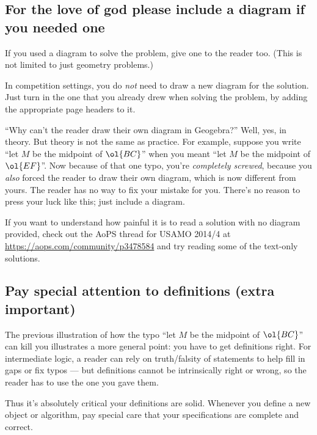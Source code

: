 \documentclass[11pt]{scrartcl}
\begin{document}
\subsection{For the love of god please include a diagram if you needed one}
If you used a diagram to solve the problem, give one to the reader too.
(This is not limited to just geometry problems.)

In competition settings, you do \emph{not} need to draw a new diagram for the solution.
Just turn in the one that you already drew when solving the problem,
by adding the appropriate page headers to it.

``Why can't the reader draw their own diagram in Geogebra?''
Well, yes, in theory. But theory is not the same as practice.
For example, suppose you write ``let $M$ be the midpoint of $\ol{BC}$''
when you meant ``let $M$ be the midpoint of $\ol{EF}$''.
Now because of that one typo, you're \emph{completely screwed},
because you \emph{also} forced the reader to draw their own diagram,
which is now different from yours.
The reader has no way to fix your mistake for you.
There's no reason to press your luck like this; just include a diagram.

If you want to understand how painful it is to read a solution with no diagram provided,
check out the AoPS thread for USAMO 2014/4 at \url{https://aops.com/community/p3478584}
and try reading some of the text-only solutions.

\subsection{Pay special attention to definitions (extra important)}
The previous illustration of how the typo
``let $M$ be the midpoint of $\ol{BC}$'' can kill you
illustrates a more general point: you have to get definitions right.
For intermediate logic, a reader can rely on truth/falsity of statements
to help fill in gaps or fix typos --- but definitions cannot be
intrinsically right or wrong, so the reader has to use the one you gave them.

Thus it's absolutely critical your definitions are solid.
Whenever you define a new object or algorithm,
pay special care that your specifications are complete and correct.
\end{document}
